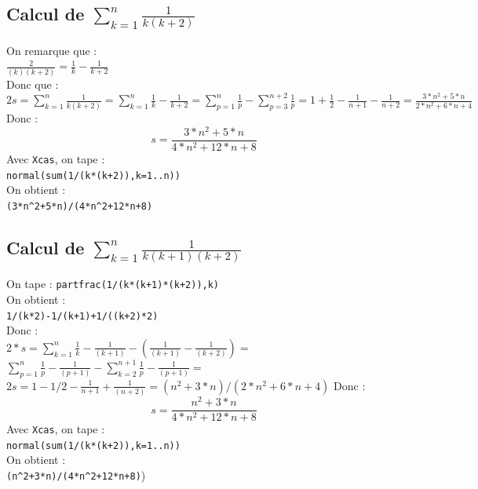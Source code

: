 \documentclass[a4paper,11pt]{book}
\begin{document}
\subsection{Calcul de $\sum_{k=1}^n\frac{1}{k(k+2)}$}
On remarque que :\\
$\frac{2}{(k)(k+2)}=\frac{1}{k}-\frac{1}{k+2}$\\
Donc que :\\
$\displaystyle 2s=\sum_{k=1}^n\frac{1}{k(k+2)}=\sum_{k=1}^n\frac{1}{k}-\frac{1}{k+2}=\sum_{p=1}^n\frac{1}{p}-\sum_{p=3}^{n+2}\frac{1}{p}=1+\frac{1}{2}-\frac{1}{n+1}-\frac{1}{n+2}=\frac{3*n^2+5*n}{2*n^2+6*n+4}$\\
Donc :
$$s=\frac{3*n^2+5*n}{4*n^2+12*n+8}$$
Avec {\tt Xcas}, on tape :\\
{\tt normal(sum(1/(k*(k+2)),k=1..n))}\\
On obtient :\\
{\tt (3*n\verb|^|2+5*n)/(4*n\verb|^|2+12*n+8)}

\subsection{Calcul de $\sum_{k=1}^n\frac{1}{k(k+1)(k+2)}$}
On tape :
{\tt partfrac(1/(k*(k+1)*(k+2)),k)}\\
On obtient :\\
{\tt 1/(k*2)-1/(k+1)+1/((k+2)*2)}\\
Donc :\\
$2*s=\sum_{k=1}^n\frac{1}{k}-\frac{1}{(k+1)}-(\frac{1}{(k+1)}-\frac{1}{(k+2)})=$\\
$\sum_{p=1}^n\frac{1}{p}-\frac{1}{(p+1)}-\sum_{k=2}^{n+1}\frac{1}{p}-\frac{1}{(p+1)}=$\\
$2s=1-1/2-\frac{1}{n+1}+\frac{1}{(n+2)}=(n^2+3*n)/(2*n^2+6*n+4)$
Donc :
$$s=\frac{n^2+3*n}{4*n^2+12*n+8}$$
Avec {\tt Xcas}, on tape :\\
{\tt normal(sum(1/(k*(k+2)),k=1..n))}\\
On obtient :\\
{\tt (n\verb|^|2+3*n)/(4*n\verb|^|2+12*n+8)})
\end{document}
